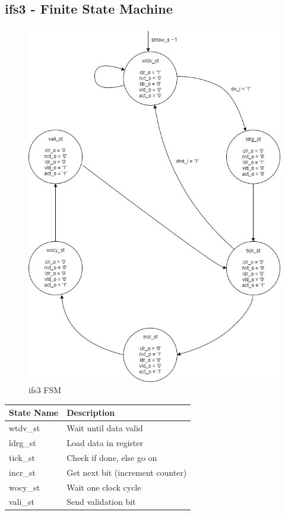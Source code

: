 \documentclass[12pt,a4 paper] {report}
\begin{document}
\newpage

\subsection*{ifs3 - Finite State Machine}
\begin{figure}[h]
	\centering	
	\includegraphics[scale=0.5]{../png/ifs3.png}
	\caption{ifs3 FSM}
\end{figure}
\begin{center}
 \begin{tabular}{| p{4cm} | p{7cm} |}
	 \hline
	 \textbf{State Name} & \textbf{Description} \\
	 \hline
	 wtdv\_st & Wait until data valid \\
	 \hline
	 ldrg\_st & Load data in register \\
	 \hline
	 tick\_st & Check if done, else go on \\
	 \hline
	 incr\_st & Get next bit (increment counter) \\
	 \hline
	 wocy\_st & Wait one clock cycle \\
	 \hline
	 vali\_st & Send validation bit \\
	 \hline
 \end{tabular}
\end{center}
\end{document}
